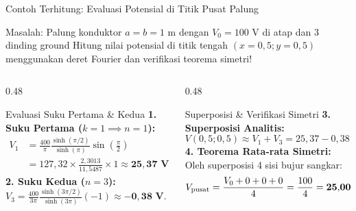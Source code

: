 \documentclass[aspectratio=169,10pt]{beamer}
\begin{document}
\begin{frame}{Contoh Terhitung: Evaluasi Potensial di Titik Pusat Palung}
  \begin{exampleblock}{Masalah: Palung konduktor $a = b = 1\text{ m}$ dengan $V_0 = 100\text{ V}$ di atap dan 3 dinding ground}
    Hitung nilai potensial di titik tengah $(x = 0{,}5; y = 0{,}5)$ menggunakan deret Fourier dan verifikasi teorema simetri!
  \end{exampleblock}
  \begin{columns}[t]
    \begin{column}{0.48\textwidth}
      \begin{block}{Evaluasi Suku Pertama \& Kedua}
        \small
        \textbf{1. Suku Pertama ($k=1 \implies n=1$):}
        \begin{align*}
          V_1 &= \frac{400}{\pi} \frac{\sinh(\pi/2)}{\sinh(\pi)} \sin\left(\frac{\pi}{2}\right) \\
              &= 127{,}32 \times \frac{2{,}3013}{11{,}5487} \times 1 \approx \mathbf{25{,}37\text{ V}}
        \end{align*}
        \textbf{2. Suku Kedua ($n=3$):}
        $V_3 = \frac{400}{3\pi} \frac{\sinh(3\pi/2)}{\sinh(3\pi)} (-1) \approx \mathbf{-0{,}38\text{ V}}$.
      \end{block}
    \end{column}
    \begin{column}{0.48\textwidth}
      \begin{alertblock}{Superposisi \& Verifikasi Simetri}
        \small
        \textbf{3. Superposisi Analitis:}
        \begin{equation*}
          V(0{,}5; 0{,}5) \approx V_1 + V_3 = 25{,}37 - 0{,}38 = \mathbf{24{,}99\text{ V}}
        \end{equation*}
        \textbf{4. Teorema Rata-rata Simetri:}
        Oleh superposisi 4 sisi bujur sangkar:
        \begin{equation*}
          V_{\text{pusat}} = \frac{V_0 + 0 + 0 + 0}{4} = \frac{100}{4} = \mathbf{25{,}00\text{ V}} \quad \qed
        \end{equation*}
      \end{alertblock}
    \end{column}
  \end{columns}
\end{frame}
\end{document}
